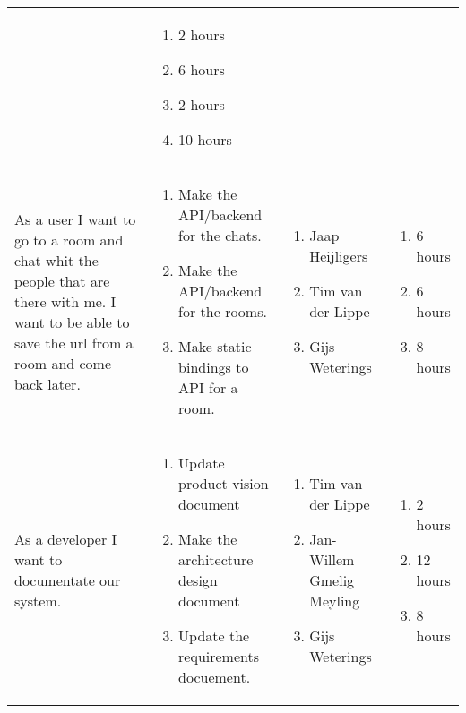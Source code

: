 \documentclass[11pt,a4paper]{article}
\begin{document}
\begin{table}[h]
\begin{tabular}{|p{4.5cm}|p{7cm}|p{4cm}|p{2.6cm}|}
&

\begin{enumerate}
\item 2 hours
\item 6 hours
\item 2 hours
\item 10 hours
\end{enumerate}

\\

As a user I want to go to a room and chat whit the people that are there with me.
I want to be able to save the url from a room and come back later.
&
\begin{enumerate}
\item Make the API/backend for the chats.
\item Make the API/backend for the rooms.
\item Make static bindings to API for a room.
\end{enumerate}

&

\begin{enumerate}
\item Jaap Heijligers
\item Tim van der Lippe
\item Gijs Weterings
\end{enumerate}

&
\begin{enumerate}
\item 6 hours
\item 6 hours
\item 8 hours
\end{enumerate}
           
\\

As a developer I want to documentate our system.
&
\begin{enumerate}
\item Update product vision document
\item Make the architecture design document
\item Update the requirements docuement.
\end{enumerate} 
           
&
\begin{enumerate}
\item Tim van der Lippe
\item Jan-Willem Gmelig Meyling
\item Gijs Weterings
\end{enumerate}
           
&

\begin{enumerate}
\item 2 hours
\item 12 hours
\item 8 hours
\end{enumerate}

           
\end{tabular}
\end{table}
\end{document}
